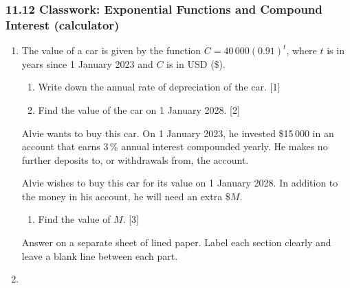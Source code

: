 \documentclass[12pt, twoside]{article}
\begin{document}
\subsubsection*{11.12 Classwork: Exponential Functions and Compound Interest (calculator)}

\begin{enumerate}[itemsep=0.15cm]

\item[1.] [Maximum mark: 6]

The value of a car is given by the function $C = 40\,000(0.91)^t$,
where $t$ is in years since 1 January 2023 and $C$ is in USD (\$).

\begin{enumerate}[itemsep=0.15cm]
  \item Write down the annual rate of depreciation of the car. \hfill [1]
  \item Find the value of the car on 1 January 2028. \hfill [2]
\end{enumerate}

Alvie wants to buy this car. On 1 January 2023, he invested \$15\,000
in an account that earns 3\,\% annual interest compounded yearly.
He makes no further deposits to, or withdrawals from, the account.

Alvie wishes to buy this car for its value on 1 January 2028.
In addition to the money in his account, he will need an extra \$$M$.

\begin{enumerate}[itemsep=0.15cm]
  \item[(c)] Find the value of $M$. \hfill [3]
\end{enumerate}


\vspace{0.2cm}

\newpage

Answer on a separate sheet of lined paper. Label each section clearly and leave a blank line between each part.
\item[2.] [Maximum mark: 16]


\end{enumerate}
\end{document}

